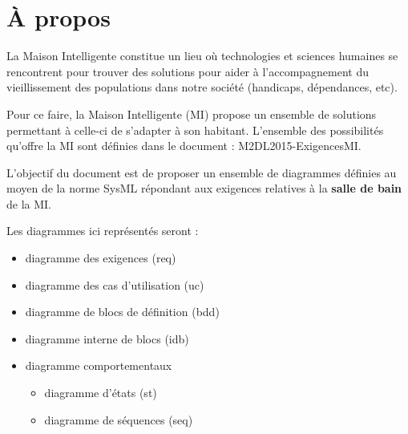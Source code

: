 \chapter*{À propos}

La Maison Intelligente constitue un lieu où technologies et sciences humaines se rencontrent pour trouver des solutions pour aider à l'accompagnement du vieillissement des populations dans notre société (handicaps, dépendances, etc).
 
Pour ce faire, la Maison Intelligente (MI) propose un ensemble de solutions permettant à celle-ci de s'adapter à son habitant.  L'ensemble des possibilités qu'offre la MI sont définies dans le document : M2DL2015-ExigencesMI.


L'objectif du document est de proposer un ensemble de diagrammes définies au moyen de la norme SysML répondant aux exigences relatives à la \textbf{salle de bain} de la MI.

Les diagrammes ici représentés seront :
\begin{itemize}
	\item diagramme des exigences (req)
	\item diagramme des cas d'utilisation (uc)
	\item diagramme de blocs de définition (bdd)
	\item diagramme interne de blocs (idb)
	\item diagramme comportementaux
	\begin{itemize}
		\item diagramme d'états (st)
		\item diagramme de séquences (seq)
	\end{itemize}
\end{itemize} 